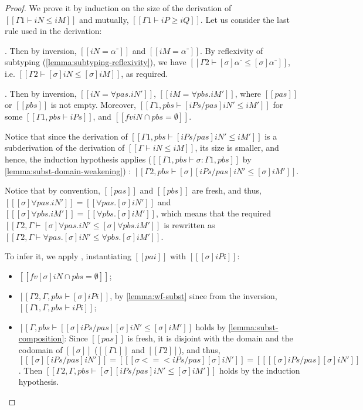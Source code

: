 \lemmaSubstPresSubt*
\begin{proof}
  We prove it by induction on the size of the derivation of $[[Γ1 ⊢ iN ≤ iM]]$
  and mutually, $[[Γ1 ⊢ iP ≥ iQ]]$. Let us consider the last rule 
  used in the derivation:
  \begin{caseof}
    \item {}. Then by inversion, 
      $[[iN = α⁻]]$ and $[[iM = α⁻]]$. By reflexivity of subtyping
      (\cref{lemma:subtyping-reflexivity}),
      we have $[[Γ2 ⊢ [σ]α⁻ ≤ [σ]α⁻]]$, i.e. $[[Γ2 ⊢ [σ]iN ≤ [σ]iM]]$,
      as required.
    \item  {}. Then by inversion,
      $[[iN = ∀pas.iN']]$, $[[iM = ∀pbs.iM']]$, where $[[pas]]$ or $[[pbs]]$ is not empty.
      Moreover, $[[Γ1, pbs ⊢ [iPs/pas]iN' ≤ iM']]$ for some $[[Γ1, pbs ⊢ iPs]]$, and 
      $[[fv iN ∩ {pbs} = ∅ ]]$.

      Notice that since the derivation of $[[Γ1, pbs ⊢ [iPs/pas]iN' ≤ iM']]$ is
      a subderivation of the derivation of $[[Γ ⊢ iN ≤ iM]]$, its size is smaller, 
      and hence, the induction hypothesis applies
      ($[[Γ1, pbs ⊢ σ : Γ1, pbs]]$ by \cref{lemma:subst-domain-weakening})
      :
      $[[Γ2, pbs ⊢ [σ][iPs/pas]iN' ≤ [σ]iM']]$.

      Notice that by convention, $[[pas]]$ and $[[pbs]]$ are fresh, and thus,  
      $[[ [σ]∀pas.iN' ]] = [[ ∀pas.[σ]iN' ]]$ and $[[ [σ]∀pbs.iM' ]] = [[ ∀pbs.[σ]iM' ]]$, 
      which means that the required $[[Γ2, Γ ⊢ [σ]∀pas.iN' ≤ [σ]∀pbs.iM']]$ is rewritten as
      $[[Γ2 , Γ ⊢ ∀pas.[σ]iN' ≤ ∀pbs.[σ]iM']]$.

      To infer it, we apply , 
      instantiating $[[pai]]$ with $[[ [σ]iPi ]]$:
      \begin{itemize}
        \item $[[fv [σ]iN ∩ {pbs} = ∅ ]]$;
        \item $[[Γ2, Γ,pbs⊢ [σ]iPi]]$, by \cref{lemma:wf-subst} since from the inversion,
          $[[Γ1, Γ, pbs ⊢ iPi]]$;
        \item $[[Γ, pbs ⊢ [ [σ]iPs/pas ][σ]iN' ≤ [σ]iM']]$ holds
          by \cref{lemma:subst-composition}:
          Since $[[pas]]$ is fresh, it is disjoint with the domain and the codomain of $[[σ]]$
          ($[[Γ1]]$ and $[[Γ2]]$), and thus, 
          $[[ [σ][iPs/pas]iN' ]] = [[ [ σ <=< iPs/pas ][σ]iN' ]] = [[ [ [σ]iPs/pas ][σ]iN' ]]$.
          Then $[[Γ2, Γ, pbs ⊢ [σ][iPs/pas]iN' ≤ [σ]iM']]$ holds by the induction hypothesis.
      \end{itemize}


\end{caseof}
\end{proof}
